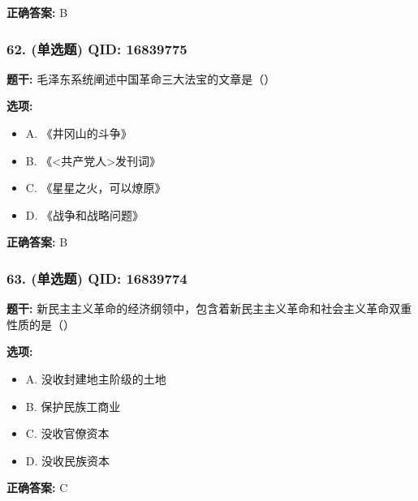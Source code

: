 \documentclass[12pt,UTF8]{ctexart}
\begin{document}
\textbf{正确答案:}
B

\vspace{0.3em}\hrulefill\vspace{0.7em}

\subsubsection*{62. (单选题) \small QID: 16839775}

\textbf{题干:}
毛泽东系统阐述中国革命三大法宝的文章是（）

\textbf{选项:}
\begin{itemize}[leftmargin=*]

  \item A. 《井冈山的斗争》

  \item B. 《<共产党人>发刊词》

  \item C. 《星星之火，可以燎原》

  \item D. 《战争和战略问题》

\end{itemize}

\textbf{正确答案:}
B

\vspace{0.3em}\hrulefill\vspace{0.7em}

\subsubsection*{63. (单选题) \small QID: 16839774}

\textbf{题干:}
新民主主义革命的经济纲领中，包含着新民主主义革命和社会主义革命双重性质的是（）

\textbf{选项:}
\begin{itemize}[leftmargin=*]

  \item A. 没收封建地主阶级的土地

  \item B. 保护民族工商业

  \item C. 没收官僚资本

  \item D. 没收民族资本

\end{itemize}

\textbf{正确答案:}
C

\vspace{0.3em}\hrulefill\vspace{0.7em}
\end{document}
